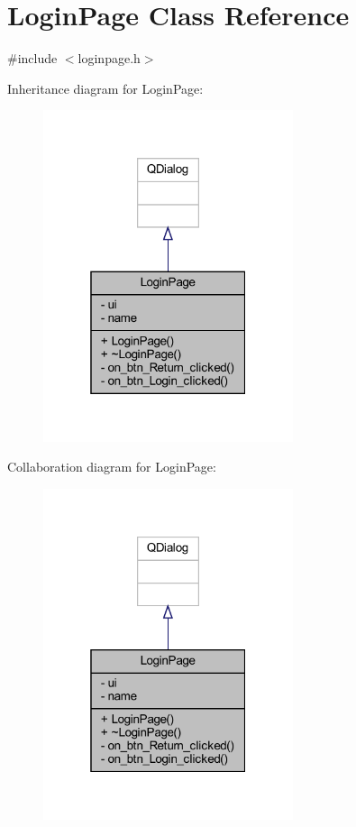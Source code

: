 \hypertarget{class_login_page}{}\section{Login\+Page Class Reference}
\label{class_login_page}


{\ttfamily \#include $<$loginpage.\+h$>$}



Inheritance diagram for Login\+Page\+:
\nopagebreak
\begin{figure}[H]
\begin{center}
\leavevmode
\includegraphics[width=208pt]{class_login_page__inherit__graph}
\end{center}
\end{figure}


Collaboration diagram for Login\+Page\+:
\nopagebreak
\begin{figure}[H]
\begin{center}
\leavevmode
\includegraphics[width=208pt]{class_login_page__coll__graph}
\end{center}
\end{figure}
